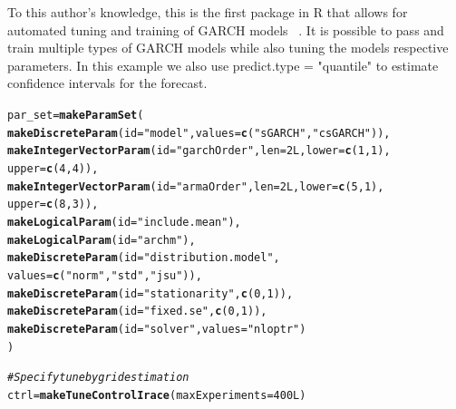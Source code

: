 \documentclass[12pt]{article}\usepackage[]{graphicx}\usepackage[]{color}
\makeatletter
\newcommand{\hlnum}[1]{\textcolor[rgb]{0.686,0.059,0.569}{#1}}%
\newcommand{\hlstr}[1]{\textcolor[rgb]{0.192,0.494,0.8}{#1}}%
\newcommand{\hlcom}[1]{\textcolor[rgb]{0.678,0.584,0.686}{\textit{#1}}}%
\newcommand{\hlstd}[1]{\textcolor[rgb]{0.345,0.345,0.345}{#1}}%
\newcommand{\hlkwb}[1]{\textcolor[rgb]{0.69,0.353,0.396}{#1}}%
\newcommand{\hlkwc}[1]{\textcolor[rgb]{0.333,0.667,0.333}{#1}}%
\newcommand{\hlkwd}[1]{\textcolor[rgb]{0.737,0.353,0.396}{\textbf{#1}}}%
\newenvironment{kframe}{%
 \def\at@end@of@kframe{}%
 \ifinner\ifhmode%
  \def\at@end@of@kframe{\end{minipage}}%
  \begin{minipage}{\columnwidth}%
 \fi\fi%
 \def\FrameCommand##1{\hskip\@totalleftmargin \hskip-\fboxsep
 \colorbox{shadecolor}{##1}\hskip-\fboxsep
     \hskip-\linewidth \hskip-\@totalleftmargin \hskip\columnwidth}%
 \MakeFramed {\advance\hsize-\width
   \@totalleftmargin\z@ \linewidth\hsize
   \@setminipage}}%
 {\par\unskip\endMakeFramed%
 \at@end@of@kframe}
\newenvironment{knitrout}{}{} %
\theoremstyle{definition}
\newcommand\code{\@codex}
\def\@codex#1{{\normalfont\ttfamily\hyphenchar\font=-1 #1}}
\let\proglang=\textsf
\makeatother
\begin{document}
To this author's knowledge, this is the first package in \proglang{R} that allows for automated tuning and training of GARCH models ~\cite{garchengels}. It is possible to pass and train multiple types of GARCH models while also tuning the models respective parameters. In this example we also use \code{predict.type = "quantile"} to estimate confidence intervals for the forecast.

\singlespacing
\begin{knitrout}
\color{fgcolor}\begin{kframe}
\begin{alltt}
\hlstd{par_set} \hlkwb{=} \hlkwd{makeParamSet}\hlstd{(}
  \hlkwd{makeDiscreteParam}\hlstd{(}\hlkwc{id} \hlstd{=} \hlstr{"model"}\hlstd{,} \hlkwc{values} \hlstd{=} \hlkwd{c}\hlstd{(}\hlstr{"sGARCH"}\hlstd{,} \hlstr{"csGARCH"}\hlstd{)),}
  \hlkwd{makeIntegerVectorParam}\hlstd{(}\hlkwc{id} \hlstd{=} \hlstr{"garchOrder"}\hlstd{,} \hlkwc{len} \hlstd{=} \hlnum{2L}\hlstd{,} \hlkwc{lower} \hlstd{=} \hlkwd{c}\hlstd{(}\hlnum{1}\hlstd{,}\hlnum{1}\hlstd{),}
                         \hlkwc{upper} \hlstd{=} \hlkwd{c}\hlstd{(}\hlnum{4}\hlstd{,}\hlnum{4}\hlstd{)),}
  \hlkwd{makeIntegerVectorParam}\hlstd{(}\hlkwc{id} \hlstd{=} \hlstr{"armaOrder"}\hlstd{,} \hlkwc{len} \hlstd{=} \hlnum{2L}\hlstd{,} \hlkwc{lower} \hlstd{=} \hlkwd{c}\hlstd{(}\hlnum{5}\hlstd{,}\hlnum{1}\hlstd{),}
                         \hlkwc{upper} \hlstd{=} \hlkwd{c}\hlstd{(}\hlnum{8}\hlstd{,}\hlnum{3}\hlstd{)),}
  \hlkwd{makeLogicalParam}\hlstd{(}\hlkwc{id} \hlstd{=} \hlstr{"include.mean"}\hlstd{),}
  \hlkwd{makeLogicalParam}\hlstd{(}\hlkwc{id} \hlstd{=} \hlstr{"archm"}\hlstd{),}
  \hlkwd{makeDiscreteParam}\hlstd{(}\hlkwc{id} \hlstd{=} \hlstr{"distribution.model"}\hlstd{,}
                    \hlkwc{values} \hlstd{=} \hlkwd{c}\hlstd{(}\hlstr{"norm"}\hlstd{,}\hlstr{"std"}\hlstd{,}\hlstr{"jsu"}\hlstd{)),}
  \hlkwd{makeDiscreteParam}\hlstd{(}\hlkwc{id} \hlstd{=} \hlstr{"stationarity"}\hlstd{,} \hlkwd{c}\hlstd{(}\hlnum{0}\hlstd{,}\hlnum{1}\hlstd{)),}
  \hlkwd{makeDiscreteParam}\hlstd{(}\hlkwc{id} \hlstd{=} \hlstr{"fixed.se"}\hlstd{,} \hlkwd{c}\hlstd{(}\hlnum{0}\hlstd{,}\hlnum{1}\hlstd{)),}
  \hlkwd{makeDiscreteParam}\hlstd{(}\hlkwc{id} \hlstd{=} \hlstr{"solver"}\hlstd{,} \hlkwc{values} \hlstd{=} \hlstr{"nloptr"}\hlstd{)}
\hlstd{)}

\hlcom{#Specify tune by grid estimation}
\hlstd{ctrl} \hlkwb{=} \hlkwd{makeTuneControlIrace}\hlstd{(}\hlkwc{maxExperiments} \hlstd{=} \hlnum{400L}\hlstd{)}


\end{alltt}
\end{kframe}
\end{knitrout}
\end{document}
